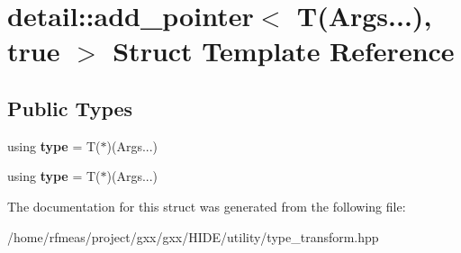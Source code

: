 \hypertarget{structdetail_1_1add__pointer_3_01T_07Args_8_8_8_08_00_01true_01_4}{}\section{detail\+:\+:add\+\_\+pointer$<$ T(Args...), true $>$ Struct Template Reference}
\label{structdetail_1_1add__pointer_3_01T_07Args_8_8_8_08_00_01true_01_4}
\subsection*{Public Types}
\begin{DoxyCompactItemize}
\item 
using {\bfseries type} = T($\ast$)(Args...)\hypertarget{structdetail_1_1add__pointer_3_01T_07Args_8_8_8_08_00_01true_01_4_ad4e4ca39b13c265c110e6d065161ad53}{}\label{structdetail_1_1add__pointer_3_01T_07Args_8_8_8_08_00_01true_01_4_ad4e4ca39b13c265c110e6d065161ad53}

\item 
using {\bfseries type} = T($\ast$)(Args...)\hypertarget{structdetail_1_1add__pointer_3_01T_07Args_8_8_8_08_00_01true_01_4_ad4e4ca39b13c265c110e6d065161ad53}{}\label{structdetail_1_1add__pointer_3_01T_07Args_8_8_8_08_00_01true_01_4_ad4e4ca39b13c265c110e6d065161ad53}

\end{DoxyCompactItemize}


The documentation for this struct was generated from the following file\+:\begin{DoxyCompactItemize}
\item 
/home/rfmeas/project/gxx/gxx/\+H\+I\+D\+E/utility/type\+\_\+transform.\+hpp\end{DoxyCompactItemize}
